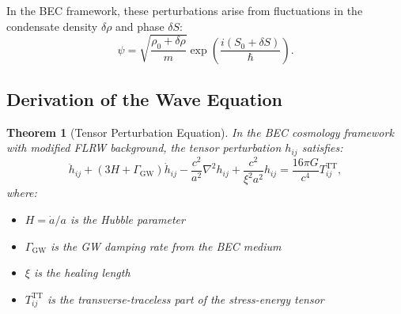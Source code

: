 \documentclass[11pt,a4paper]{article}
\newtheorem{theorem}{Theorem}[section]
\theoremstyle{definition}
\theoremstyle{remark}
\begin{document}
In the BEC framework, these perturbations arise from fluctuations in the condensate density $\delta\rho$ and phase $\delta S$:
\begin{equation}
\psi = \sqrt{\frac{\rho_0 + \delta\rho}{m}}\exp\left(\frac{i(S_0 + \delta S)}{\hbar}\right).
\end{equation}

\subsection{Derivation of the Wave Equation}
\label{sec:wave_equation}

\begin{theorem}[Tensor Perturbation Equation]
\label{thm:tensor_equation}
In the BEC cosmology framework with modified FLRW background, the tensor perturbation $h_{ij}$ satisfies:
\begin{equation}
\label{eq:tensor_wave_equation}
\boxed{\ddot{h}_{ij} + \left(3H + \Gamma_{\mathrm{GW}}\right)\dot{h}_{ij} - \frac{c^2}{a^2}\nabla^2 h_{ij} + \frac{c^2}{\xi^2 a^2}h_{ij} = \frac{16\pi G}{c^4}T_{ij}^{\mathrm{TT}},}
\end{equation}
where:
\begin{itemize}
\item $H = \dot{a}/a$ is the Hubble parameter
\item $\Gamma_{\mathrm{GW}}$ is the GW damping rate from the BEC medium
\item $\xi$ is the healing length
\item $T_{ij}^{\mathrm{TT}}$ is the transverse-traceless part of the stress-energy tensor
\end{itemize}
\end{theorem}
\end{document}

